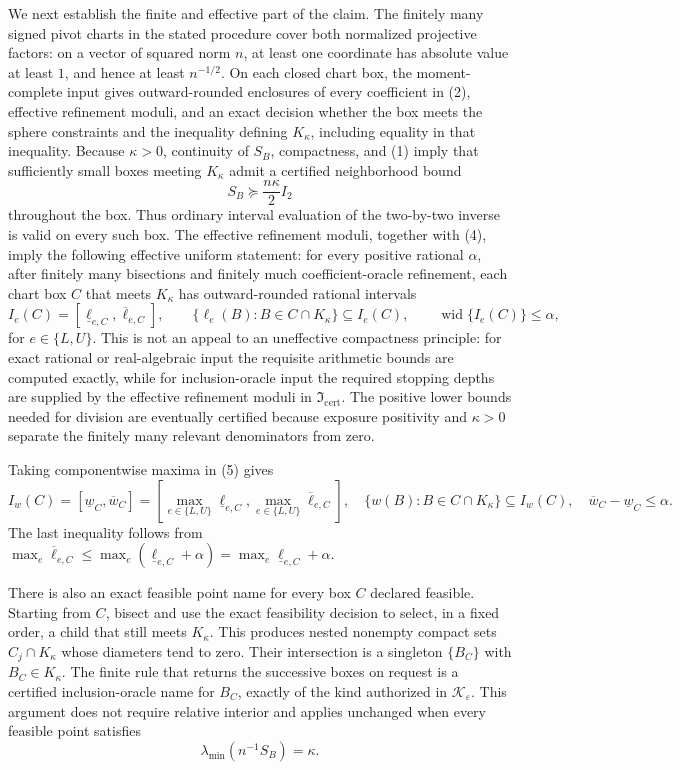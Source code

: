 We next establish the finite and effective part of the claim.  The finitely many signed pivot charts in the stated procedure cover both normalized projective factors: on a vector of squared norm \(n\), at least one coordinate has absolute value at least \(1\), and hence at least \(n^{-1/2}\).  On each closed chart box, the moment-complete input gives outward-rounded enclosures of every coefficient in (2), effective refinement moduli, and an exact decision whether the box meets the sphere constraints and the inequality defining \(K_\kappa\), including equality in that inequality.  Because \(\kappa>0\), continuity of \(S_B\), compactness, and (1) imply that sufficiently small boxes meeting \(K_\kappa\) admit a certified neighborhood bound
\[
S_B\succeq \frac{n\kappa}{2}I_2 \tag{4}
\]
throughout the box.  Thus ordinary interval evaluation of the two-by-two inverse is valid on every such box.  The effective refinement moduli, together with (4), imply the following effective uniform statement: for every positive rational \(\alpha\), after finitely many bisections and finitely much coefficient-oracle refinement, each chart box \(C\) that meets \(K_\kappa\) has outward-rounded rational intervals
\[
I_e(C)=[\underline\ell_{e,C},\overline\ell_{e,C}],
\qquad
\{\ell_e(B):B\in C\cap K_\kappa\}\subseteq I_e(C),
\qquad
\operatorname{wid}\{I_e(C)\}\leq\alpha,
\tag{5}
\]
for \(e\in\{L,U\}\).  This is not an appeal to an uneffective compactness principle: for exact rational or real-algebraic input the requisite arithmetic bounds are computed exactly, while for inclusion-oracle input the required stopping depths are supplied by the effective refinement moduli in \(\mathfrak I_{\mathrm{cert}}\).  The positive lower bounds needed for division are eventually certified because exposure positivity and \(\kappa>0\) separate the finitely many relevant denominators from zero.

Taking componentwise maxima in (5) gives
\[
I_w(C)=[\underline w_C,\overline w_C]
=\left[
\max_{e\in\{L,U\}}\underline\ell_{e,C},
\max_{e\in\{L,U\}}\overline\ell_{e,C}
\right],
\quad
\{w(B):B\in C\cap K_\kappa\}\subseteq I_w(C),
\quad
\overline w_C-\underline w_C\leq\alpha. \tag{6}
\]
The last inequality follows from
\(\max_e\overline\ell_{e,C}\leq
\max_e(\underline\ell_{e,C}+\alpha)
=\max_e\underline\ell_{e,C}+\alpha\).

There is also an exact feasible point name for every box \(C\) declared feasible.  Starting from \(C\), bisect and use the exact feasibility decision to select, in a fixed order, a child that still meets \(K_\kappa\).  This produces nested nonempty compact sets \(C_j\cap K_\kappa\) whose diameters tend to zero.  Their intersection is a singleton \(\{B_C\}\) with \(B_C\in K_\kappa\).  The finite rule that returns the successive boxes on request is a certified inclusion-oracle name for \(B_C\), exactly of the kind authorized in \(\mathscr K_\varepsilon\).  This argument does not require relative interior and applies unchanged when every feasible point satisfies
\[
\lambda_{\min}(n^{-1}S_B)=\kappa. \tag{7}
\]

